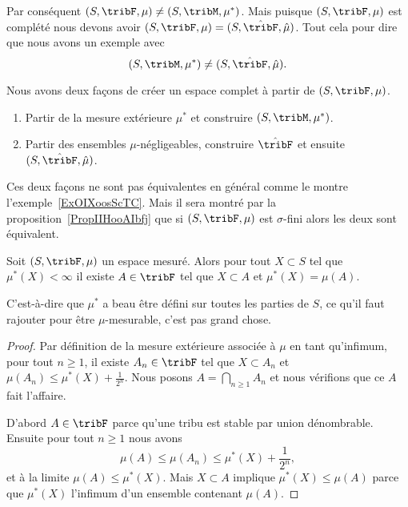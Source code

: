 \begin{example}
    Par conséquent \( (S,\tribF,\mu) \neq (S,\tribM,\mu^*)\). Mais puisque \( (S,\tribF,\mu)\) est complété nous devons avoir \( (S,\tribF,\mu)=(S,\hat\tribF,\hat\mu)\). Tout cela pour dire que nous avons un exemple avec
    \begin{equation}
        (S,\tribM,\mu^*)\neq (S,\hat\tribF,\hat \mu).
    \end{equation}
\end{example}

Nous avons deux façons de créer un espace complet à partir de \( (S,\tribF,\mu)\).
\begin{enumerate}
    \item
        Partir de la mesure extérieure \( \mu^*\) et construire \( (S,\tribM,\mu^*)\).
    \item
        Partir des ensembles \( \mu\)-négligeables, construire \( \hat\tribF\) et ensuite \( (S,\hat\tribF,\hat\mu)\).
\end{enumerate}
Ces deux façons ne sont pas équivalentes en général comme le montre l'exemple~\ref{ExOIXoosScTC}. Mais il sera montré par la proposition~\ref{PropIIHooAIbfj} que si \( (S,\tribF,\mu)\) est \( \sigma\)-fini alors les deux sont équivalent.

\begin{lemma}   \label{LemAESoofkMpi}
    Soit \( (S,\tribF,\mu)\) un espace mesuré. Alors pour tout \( X\subset S\) tel que \( \mu^*(X)<\infty\) il existe \( A\in\tribF\) tel que \( X\subset A\) et \( \mu^*(X)=\mu(A)\).
\end{lemma}
C'est-à-dire que \( \mu^*\) a beau être défini sur toutes les parties de \( S\), ce qu'il faut rajouter pour être \( \mu\)-mesurable, c'est pas grand chose.

\begin{proof}
    Par définition de la mesure extérieure associée à \( \mu\) en tant qu'infimum, pour tout \( n\geq 1\), il existe \( A_n\in\tribF\) tel que \( X\subset A_n\) et \( \mu(A_n)\leq \mu^*(X)+\frac{1}{ 2^n }\). Nous posons \( A=\bigcap_{n\geq 1}A_n\) et nous vérifions que ce \( A\) fait l'affaire.

    D'abord \( A\in\tribF\) parce qu'une tribu est stable par union dénombrable. Ensuite pour tout \( n\geq 1\) nous avons
    \begin{equation}
        \mu(A)\leq \mu(A_n)\leq \mu^*(X)+\frac{1}{ 2^n },
    \end{equation}
    et à la limite \( \mu(A)\leq \mu^*(X)\). Mais \( X\subset A\) implique \( \mu^*(X)\leq \mu(A)\) parce que \( \mu^*(X)\) l'infimum d'un ensemble contenant \( \mu(A)\).
\end{proof}

